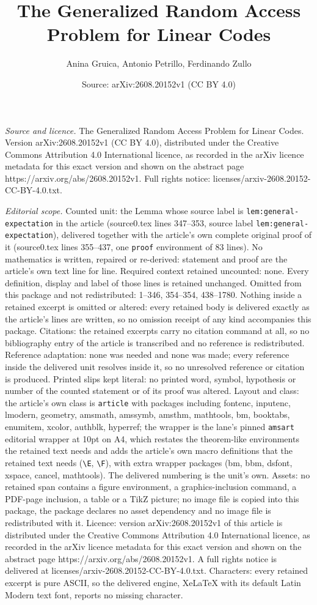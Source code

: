 \documentclass[10pt,a4paper]{amsart}
\title[The Generalized Random Access Problem for Linear Codes]{The Generalized Random Access Problem for Linear Codes}
\author{Anina Gruica, Antonio Petrillo, Ferdinando Zullo}
\date{Source: arXiv:2608.20152v1 (CC BY 4.0)}
\begin{document}
\maketitle

\noindent\emph{Source and licence.} The Generalized Random Access Problem for Linear Codes. Version arXiv:2608.20152v1 (CC BY 4.0), distributed under the Creative Commons Attribution 4.0 International licence, as recorded in the arXiv licence metadata for this exact version and shown on the abstract page https://arxiv.org/abs/2608.20152v1. Full rights notice: licenses/arxiv-2608.20152-CC-BY-4.0.txt.\par\smallskip

\noindent\textit{Editorial scope.} Counted unit: the Lemma whose source label is \texttt{lem:general-expectation} in the article (source0.tex lines 347--353, source label \texttt{lem:general-expectation}), delivered together with the article's own complete original proof of it (source0.tex lines 355--437, one \texttt{proof} environment of 83 lines). No mathematics is written, repaired or re-derived: statement and proof are the article's own text line for line. Required context retained uncounted: none. Every definition, display and label of those lines is retained unchanged. Omitted from this package and not redistributed: 1--346, 354--354, 438--1780. Nothing inside a retained excerpt is omitted or altered: every retained body is delivered exactly as the article's lines are written, so no omission receipt of any kind accompanies this package. Citations: the retained excerpts carry no citation command at all, so no bibliography entry of the article is transcribed and no reference is redistributed. Reference adaptation: none was needed and none was made; every reference inside the delivered unit resolves inside it, so no unresolved reference or citation is produced. Printed slips kept literal: no printed word, symbol, hypothesis or number of the counted statement or of its proof was altered. Layout and class: the article's own class is \texttt{article} with packages including fontenc, inputenc, lmodern, geometry, amsmath, amssymb, amsthm, mathtools, bm, booktabs, enumitem, xcolor, authblk, hyperref; the wrapper is the lane's pinned \texttt{amsart} editorial wrapper at 10pt on A4, which restates the theorem-like environments the retained text needs and adds the article's own macro definitions that the retained text needs (\texttt{\textbackslash E}, \texttt{\textbackslash F}), with extra wrapper packages (bm, bbm, dsfont, xspace, cancel, mathtools). The delivered numbering is the unit's own. Assets: no retained span contains a figure environment, a graphics-inclusion command, a PDF-page inclusion, a table or a TikZ picture; no image file is copied into this package, the package declares no asset dependency and no image file is redistributed with it. Licence: version arXiv:2608.20152v1 of this article is distributed under the Creative Commons Attribution 4.0 International licence, as recorded in the arXiv licence metadata for this exact version and shown on the abstract page https://arxiv.org/abs/2608.20152v1. A full rights notice is delivered at licenses/arxiv-2608.20152-CC-BY-4.0.txt. Characters: every retained excerpt is pure ASCII, so the delivered engine, XeLaTeX with its default Latin Modern text font, reports no missing character.
\end{document}

